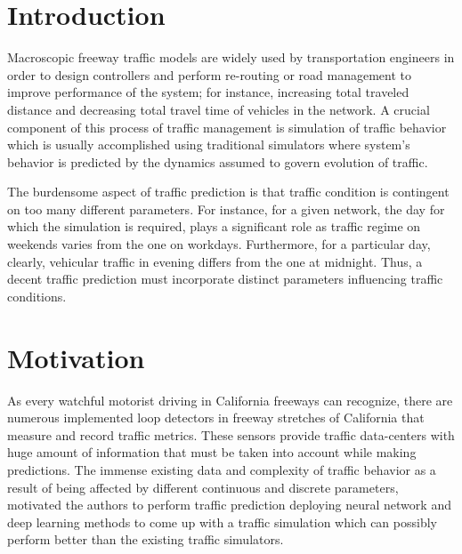 \documentclass[11pt]{article}
\begin{document}
\section*{Introduction}

\par Macroscopic freeway traffic models are widely used by transportation engineers in order to design controllers and perform re-routing or road management to improve performance of the system; for instance, increasing total traveled distance and decreasing total travel time of vehicles in the network. A crucial component of this process of traffic management is simulation of traffic behavior which is usually accomplished using traditional simulators where system's behavior is predicted by the dynamics assumed to govern evolution of traffic.

The burdensome aspect of traffic prediction is that traffic condition is contingent on too many different parameters. For instance, for a given network, the day for which the simulation is required, plays a significant role as traffic regime on weekends varies from the one on workdays. Furthermore, for a particular day, clearly, vehicular traffic in evening differs from the one at midnight. Thus, a decent traffic prediction must incorporate distinct parameters influencing traffic conditions.

\section*{Motivation}

As every watchful motorist driving in California freeways can recognize, there are numerous implemented loop detectors in freeway stretches of California that measure and record traffic metrics. These sensors provide traffic data-centers with huge amount of information that must be taken into account while making predictions. The immense existing data and complexity of traffic behavior as a result of being affected by different continuous and discrete parameters, motivated the authors to perform traffic prediction deploying neural network and deep learning methods to come up with a traffic simulation which can possibly perform better than the existing traffic simulators. 
\end{document}
